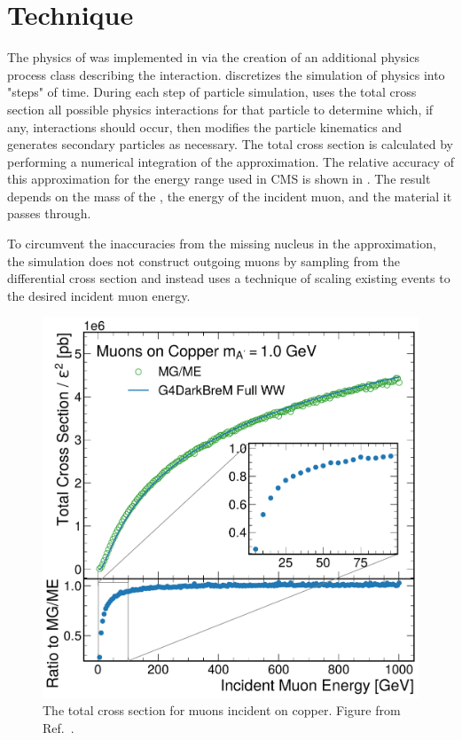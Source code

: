\section{Technique}
\label{sec:technique}

The physics of \dbrem was implemented in \gf via the creation of an additional physics process class describing the interaction. 
\gf discretizes the simulation of physics into "steps" of time. 
During each step of particle simulation, \gf uses the total cross section all possible physics interactions for that particle to determine which, if any, interactions should occur, then modifies the particle kinematics and generates secondary particles as necessary. 
The total cross section is calculated by performing a numerical integration of the \ww approximation.
The relative accuracy of this approximation for the energy range used in CMS is shown in .
The result depends on the mass of the \aprime,  the energy of the incident muon, and the material it passes through. 

To circumvent the inaccuracies from the missing nucleus in the \ww approximation, the simulation does not construct outgoing muons by sampling from the differential \ww cross section and instead uses a technique of scaling existing \mg events to the desired incident muon energy. 

\begin{figure}[!htbp]
    \centering
    \includegraphics[width=\textwidth]{figures/mu_xsec.pdf}
    \caption[
        The \dbrem cross section.
    ]{
	    The total \dbrem cross section for muons incident on copper. Figure from Ref.~\cite{Eichlersmith_2023}.
    }
    \label{fig:mu_xsec}
\end{figure}

